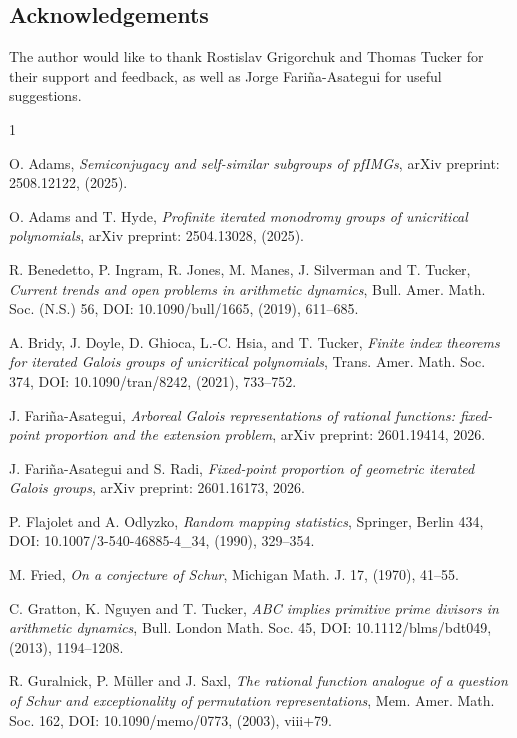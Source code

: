 \documentclass{amsart}
\theoremstyle{definition}
\begin{document}
\subsection*{Acknowledgements} 

The author would like to thank Rostislav Grigorchuk and Thomas Tucker for their support and feedback, as well as Jorge Fariña-Asategui for useful suggestions.




\begin{thebibliography}{1}

O. Adams, \textit{Semiconjugacy and self-similar subgroups of pfIMGs}, arXiv preprint: 2508.12122, (2025).

O. Adams and T. Hyde, \textit{Profinite iterated monodromy groups of unicritical polynomials}, arXiv preprint: 2504.13028, (2025).


R. Benedetto, P. Ingram, R. Jones, M. Manes, J. Silverman and T. Tucker, \textit{Current trends and open problems in arithmetic dynamics}, Bull. Amer. Math. Soc. (N.S.) 56, DOI: 10.1090/bull/1665, (2019), 611--685.

A. Bridy, J. Doyle, D. Ghioca, L.-C. Hsia, and T. Tucker, \textit{Finite index theorems for iterated Galois groups of unicritical polynomials}, Trans. Amer. Math. Soc. 374, DOI: 10.1090/tran/8242, (2021), 733--752.

J. Fariña-Asategui, \textit{Arboreal Galois representations of rational functions: fixed-point proportion and the extension problem}, arXiv preprint: 2601.19414, 2026.

J. Fariña-Asategui and S. Radi, \textit{Fixed-point proportion of geometric iterated Galois groups}, arXiv preprint: 2601.16173, 2026.

P. Flajolet and A. Odlyzko, \textit{Random mapping statistics}, Springer, Berlin 434, DOI: 10.1007/3-540-46885-4\_34, (1990), 329--354.

M. Fried, \textit{On a conjecture of Schur}, Michigan Math. J. 17, (1970), 41--55.

C. Gratton, K. Nguyen and T. Tucker, \textit{ABC implies primitive prime divisors in arithmetic dynamics}, Bull. London Math. Soc. 45, DOI: 10.1112/blms/bdt049, (2013), 1194--1208.

R. Guralnick, P. Müller and J. Saxl, \textit{The rational function analogue of a question of Schur and exceptionality of permutation representations}, Mem. Amer. Math. Soc. 162, DOI: 10.1090/memo/0773, (2003), viii+79.


\end{thebibliography}
\end{document}

